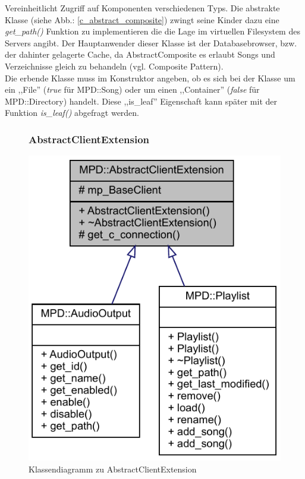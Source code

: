 Vereinheitlicht Zugriff auf Komponenten verschiedenen Typs.
Die abstrakte Klasse (siehe Abb.: \ref{c_abstract_composite}) zwingt seine Kinder dazu eine \emph{get\_path()} Funktion zu implementieren die die Lage im virtuellen Filesystem des Servers angibt.
Der Hauptanwender dieser Klasse ist der Databasebrowser, bzw. der dahinter gelagerte Cache, da AbstractComposite es erlaubt Songs und Verzeichnisse gleich zu behandeln (vgl. Composite Pattern).
\\
Die erbende Klasse muss im Konstruktor angeben, ob es sich bei der Klasse um ein ,,File'' (\emph{true} für MPD::Song) oder um einen ,,Container'' (\emph{false} für MPD::Directory) handelt.
Diese ,,is\_leaf'' Eigenschaft kann später mit der Funktion \emph{is\_leaf()} abgefragt werden.


\newpage
\begin{figure}[htb!]

\subsubsection{AbstractClientExtension}

	\centering
        \includegraphics[scale=0.8]{./gfx/class/abstractclientextension}
	\caption{Klassendiagramm zu AbstractClientExtension}
	\label{c_abstract_client_extension}
\end{figure}


